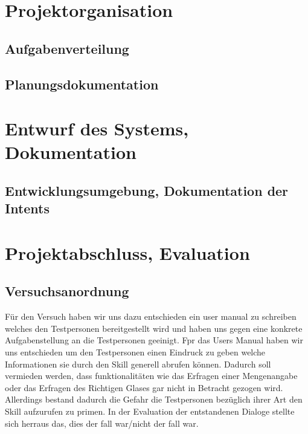 \documentclass[12pt,letterpaper]{article}
\begin{document}
\section{Projektorganisation}
\subsection{Aufgabenverteilung}
\subsection{Planungsdokumentation}

\section{Entwurf des Systems, Dokumentation}
\subsection{Entwicklungsumgebung, Dokumentation der Intents}

\section{Projektabschluss, Evaluation}
\subsection{Versuchsanordnung}
Für den Versuch haben wir uns dazu entschieden ein user manual zu schreiben welches den Testpersonen
bereitgestellt wird und haben uns gegen eine konkrete Aufgabenstellung an die Testpersonen geeinigt. Fpr das Users Manual haben wir uns entschieden um den Testpersonen einen Eindruck zu geben welche Informationen sie durch den Skill generell abrufen können. Dadurch soll vermieden werden, dass funktionalitäten wie das Erfragen einer Mengenangabe oder das Erfragen des Richtigen Glases gar nicht in Betracht gezogen wird. Allerdings bestand dadurch die Gefahr die Testpersonen bezüglich ihrer Art den Skill aufzurufen zu primen.
In der Evaluation der entstandenen Dialoge stellte sich herraus das, dies der fall war/nicht der fall war.
\\
 
\end{document}
